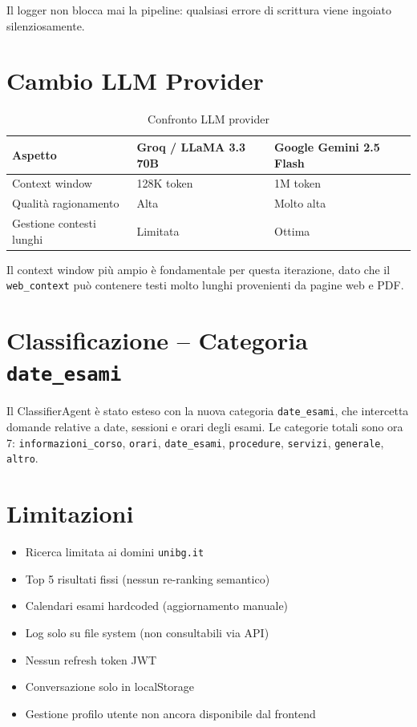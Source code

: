 \documentclass[a4paper,12pt]{report}
\begin{document}
Il logger non blocca mai la pipeline: qualsiasi errore di scrittura viene ingoiato silenziosamente.

\section{Cambio LLM Provider}

\begin{table}[H]
\centering
\begin{tabularx}{\textwidth}{l X X}
\toprule
\textbf{Aspetto} & \textbf{Groq / LLaMA 3.3 70B} & \textbf{Google Gemini 2.5 Flash} \\
\midrule
Context window & 128K token & 1M token \\
Qualità ragionamento & Alta & Molto alta \\
Gestione contesti lunghi & Limitata & Ottima \\
\bottomrule
\end{tabularx}
\caption{Confronto LLM provider}
\end{table}

Il context window più ampio è fondamentale per questa iterazione, dato che il \texttt{web\_context} può contenere testi molto lunghi provenienti da pagine web e PDF.

\section{Classificazione -- Categoria \texttt{date\_esami}}

Il ClassifierAgent è stato esteso con la nuova categoria \texttt{date\_esami}, che intercetta domande relative a date, sessioni e orari degli esami. Le categorie totali sono ora 7: \texttt{informazioni\_corso}, \texttt{orari}, \texttt{date\_esami}, \texttt{procedure}, \texttt{servizi}, \texttt{generale}, \texttt{altro}.

\section{Limitazioni}

\begin{itemize}
    \item Ricerca limitata ai domini \texttt{unibg.it}
    \item Top 5 risultati fissi (nessun re-ranking semantico)
    \item Calendari esami hardcoded (aggiornamento manuale)
    \item Log solo su file system (non consultabili via API)
    \item Nessun refresh token JWT
    \item Conversazione solo in localStorage
    \item Gestione profilo utente non ancora disponibile dal frontend
\end{itemize}
\end{document}
